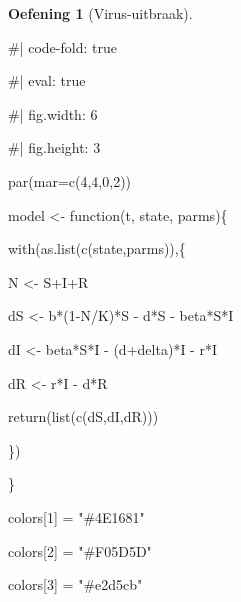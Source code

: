 \documentclass[
  a4paper,
]{scrbook}
\newenvironment{Shaded}{\begin{snugshade}}{\end{snugshade}}
\newcommand{\AttributeTok}[1]{\textcolor[rgb]{0.40,0.45,0.13}{#1}}
\newcommand{\CommentTok}[1]{\textcolor[rgb]{0.37,0.37,0.37}{#1}}
\newcommand{\ControlFlowTok}[1]{\textcolor[rgb]{0.00,0.23,0.31}{#1}}
\newcommand{\DecValTok}[1]{\textcolor[rgb]{0.68,0.00,0.00}{#1}}
\newcommand{\FunctionTok}[1]{\textcolor[rgb]{0.28,0.35,0.67}{#1}}
\newcommand{\NormalTok}[1]{\textcolor[rgb]{0.00,0.23,0.31}{#1}}
\newcommand{\OtherTok}[1]{\textcolor[rgb]{0.00,0.23,0.31}{#1}}
\newcommand{\SpecialCharTok}[1]{\textcolor[rgb]{0.37,0.37,0.37}{#1}}
\newcommand{\StringTok}[1]{\textcolor[rgb]{0.13,0.47,0.30}{#1}}
\theoremstyle{definition}
\newtheorem{exercise}{Oefening}[chapter]
\theoremstyle{remark}
\begin{document}
\begin{exercise}[Virus-uitbraak]
\begin{Shaded}
\begin{Highlighting}[]
\CommentTok{\#| code{-}fold: true}

\CommentTok{\#| eval: true}

\CommentTok{\#| fig.width: 6}

\CommentTok{\#| fig.height: 3}

\FunctionTok{par}\NormalTok{(}\AttributeTok{mar=}\FunctionTok{c}\NormalTok{(}\DecValTok{4}\NormalTok{,}\DecValTok{4}\NormalTok{,}\DecValTok{0}\NormalTok{,}\DecValTok{2}\NormalTok{))}

\NormalTok{model }\OtherTok{\textless{}{-}} \ControlFlowTok{function}\NormalTok{(t, state, parms)\{}

  \FunctionTok{with}\NormalTok{(}\FunctionTok{as.list}\NormalTok{(}\FunctionTok{c}\NormalTok{(state,parms)),\{}

\NormalTok{    N }\OtherTok{\textless{}{-}}\NormalTok{ S}\SpecialCharTok{+}\NormalTok{I}\SpecialCharTok{+}\NormalTok{R}

\NormalTok{    dS }\OtherTok{\textless{}{-}}\NormalTok{ b}\SpecialCharTok{*}\NormalTok{(}\DecValTok{1}\SpecialCharTok{{-}}\NormalTok{N}\SpecialCharTok{/}\NormalTok{K)}\SpecialCharTok{*}\NormalTok{S }\SpecialCharTok{{-}}\NormalTok{ d}\SpecialCharTok{*}\NormalTok{S }\SpecialCharTok{{-}}\NormalTok{ beta}\SpecialCharTok{*}\NormalTok{S}\SpecialCharTok{*}\NormalTok{I}

\NormalTok{    dI }\OtherTok{\textless{}{-}}\NormalTok{ beta}\SpecialCharTok{*}\NormalTok{S}\SpecialCharTok{*}\NormalTok{I }\SpecialCharTok{{-}}\NormalTok{ (d}\SpecialCharTok{+}\NormalTok{delta)}\SpecialCharTok{*}\NormalTok{I }\SpecialCharTok{{-}}\NormalTok{ r}\SpecialCharTok{*}\NormalTok{I}

\NormalTok{    dR }\OtherTok{\textless{}{-}}\NormalTok{ r}\SpecialCharTok{*}\NormalTok{I }\SpecialCharTok{{-}}\NormalTok{ d}\SpecialCharTok{*}\NormalTok{R}

    \FunctionTok{return}\NormalTok{(}\FunctionTok{list}\NormalTok{(}\FunctionTok{c}\NormalTok{(dS,dI,dR)))}

\NormalTok{  \})}

\NormalTok{\}}

\NormalTok{colors[}\DecValTok{1}\NormalTok{] }\OtherTok{=} \StringTok{"\#4E1681"}

\NormalTok{colors[}\DecValTok{2}\NormalTok{] }\OtherTok{=} \StringTok{"\#F05D5D"}

\NormalTok{colors[}\DecValTok{3}\NormalTok{] }\OtherTok{=} \StringTok{"\#e2d5cb"}


\end{Highlighting}
\end{Shaded}
\end{exercise}
\end{document}
